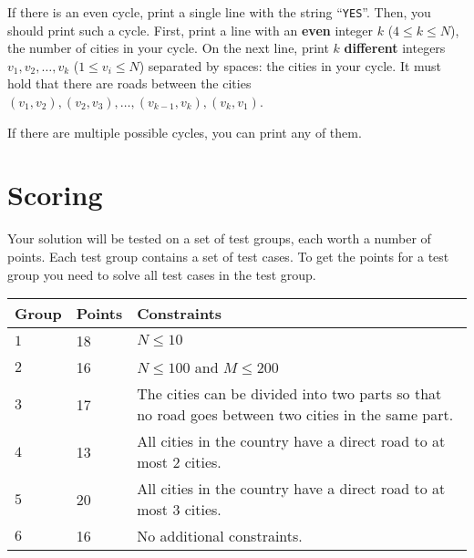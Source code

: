 If there is an even cycle, print a single line with the string ``\texttt{YES}''.
Then, you should print such a cycle.
First, print a line with an \textbf{even} integer $k$ ($4 \le k \le N$), the number of cities in your cycle.
On the next line, print $k$ \textbf{different} integers $v_{1}, v_{2}, \ldots, v_{k}$ ($1 \le v_{i} \le N$) separated by spaces: the cities in your cycle.
It must hold that there are roads between the cities $(v_{1}, v_{2}), (v_{2}, v_{3}), \ldots, (v_{k-1}, v_{k}), (v_{k}, v_{1})$.

If there are multiple possible cycles, you can print any of them.

\section*{Scoring}
Your solution will be tested on a set of test groups, each worth a number of points. Each test group contains
a set of test cases. To get the points for a test group you need to solve all test cases in the test group.

\noindent
\begin{tabular}{| l | l | l |}
  \hline
  \textbf{Group} & \textbf{Points} & \textbf{Constraints} \\ \hline
  $1$ & 18 & $N \le 10$ \\ \hline
  $2$ & 16 & $N \le 100$ and $M \le 200$ \\ \hline
  $3$ & 17 & The cities can be divided into two parts so that no road goes between two cities in the same part. \\ \hline
  $4$ & 13 & All cities in the country have a direct road to at most 2 cities. \\ \hline
  $5$ & 20 & All cities in the country have a direct road to at most 3 cities. \\ \hline
  $6$ & 16 & No additional constraints. \\ \hline
\end{tabular}



